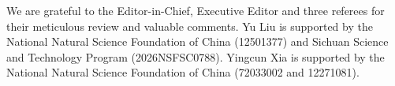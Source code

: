 We are grateful to the Editor-in-Chief, Executive Editor and three referees for their meticulous review and valuable comments. Yu Liu is supported by the National Natural Science Foundation of China (12501377) and Sichuan Science and Technology Program (2026NSFSC0788). Yingcun Xia is supported by the National Natural Science Foundation of China (72033002 and 12271081).



\newpage

\address{Yu Liu\\
	Sichuan Normal University\\
	School of Mathematical Sciences\\
	China\\
	}

\address{Yingcun Xia\\
  University of Electronic Science and Technology of China\\
  School of Mathematical Sciences\\
  China\\
  }
